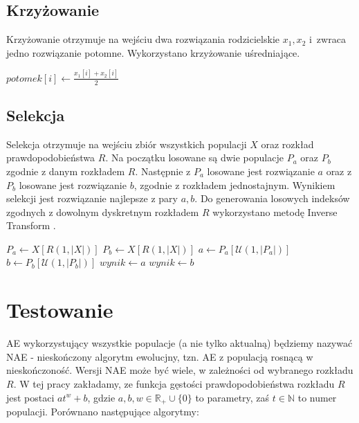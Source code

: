 \documentclass[12pt, a4paper]{article}
\begin{document}
\subsection{Krzyżowanie}

Krzyżowanie otrzymuje na wejściu dwa rozwiązania rodzicielskie $x_1,x_2$ i~zwraca jedno rozwiązanie potomne. 
Wykorzystano krzyżowanie uśredniające.

\begin{algorithm}[H]
\begin{algorithmic}[1]
    \State $potomek[i] \gets \frac{x_1[i] + x_2[i]}{2}$
  \EndFor
\EndFunction
\end{algorithmic}
\end{algorithm}

\subsection{Selekcja}

Selekcja otrzymuje na wejściu zbiór wszystkich populacji $X$ oraz rozkład prawdopodobieństwa $R$.
Na początku losowane są dwie populacje $P_a$ oraz $P_b$ zgodnie z danym rozkładem $R$.
Następnie z $P_a$ losowane jest rozwiązanie $a$ oraz z $P_b$ losowane jest rozwiązanie $b$, zgodnie
z rozkładem jednostajnym. Wynikiem selekcji jest rozwiązanie najlepsze z pary $a,b$.
Do generowania losowych indeksów zgodnych z dowolnym dyskretnym rozkładem $R$ wykorzystano
metodę Inverse Transform \cite{norm}.

\begin{algorithm}[H]
\begin{algorithmic}[1]
  \State $P_a \gets X[R(1, |X|)]$
  \State $P_b \gets X[R(1, |X|)]$
  \State $a \gets P_a[\mathcal{U}(1, |P_a|)]$  
  \State $b \gets P_b[\mathcal{U}(1, |P_b|)]$
    \State $wynik \gets a$
  \Else
    \State $wynik \gets b$
  \EndIf
\EndFunction
\end{algorithmic}
\end{algorithm}

\section{Testowanie}

AE wykorzystujący wszystkie populacje (a nie tylko aktualną) będziemy nazywać NAE - nieskończony algorytm ewolucjny, 
tzn. AE z populacją rosnącą w nieskończoność.
Wersji NAE może być wiele, w zależności od wybranego rozkładu $R$. 
W tej pracy zakładamy, ze funkcja gęstości prawdopodobieństwa rozkładu $R$ jest postaci $at^w + b$, gdzie
$a, b, w \in \mathbb{R_+} \cup \{0\}$ to parametry, zaś $t \in \mathbb{N}$ to numer populacji. 
Porównano następujące algorytmy:
\end{document}
